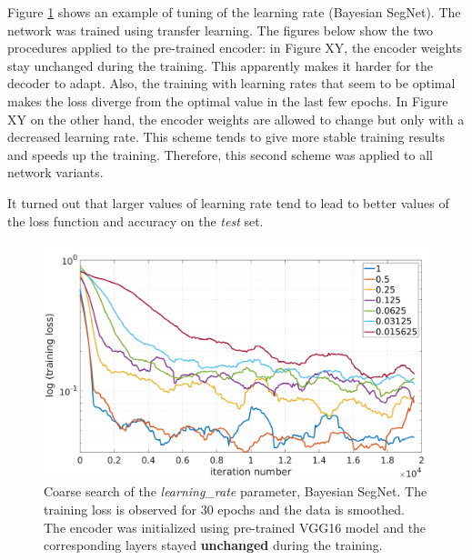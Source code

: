 Figure \ref{tuning1} shows an example of tuning of the learning rate (Bayesian SegNet). The network was trained using transfer learning. The figures below show the two procedures applied to the pre-trained encoder: in Figure XY, the encoder weights stay unchanged during the training. This apparently makes it harder for the decoder to adapt. Also, the training with learning rates that seem to be optimal makes the loss diverge from the optimal value in the last few epochs. In Figure XY on the other hand, the encoder weights are allowed to change but only with a decreased learning rate. This scheme tends to give more stable training results and speeds up the training. Therefore, this second scheme was applied to all network variants.  

It turned out that larger values of learning rate tend to lead to better values of the loss function and accuracy on the \textit{test} set. 

\newpage

\begin{figure}[h]
	\begin{center}
		\includegraphics*[width=14cm, keepaspectratio]{obr/bayes_full_rough.png}
	\end{center}
	\vspace{5mm}
	\caption{Coarse search of the \textit{learning\_rate} parameter, Bayesian SegNet. The training loss is observed for 30 epochs and the data is smoothed. The encoder was initialized using pre-trained VGG16 model and the corresponding layers stayed \textbf{unchanged} during the training.} 
	\label{tuning1}
\end{figure}

